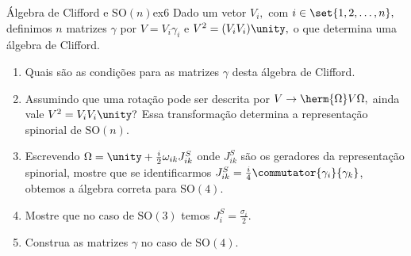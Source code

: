 \begin{exercício}{Álgebra de Clifford e \(\mathrm{SO}(n)\)}{ex6}
    Dado um vetor \(V_i,\) com \(i \in \set{1,2,\dots, n},\) definimos \(n\) matrizes \(\gamma\) por \(V = V_i \gamma_i\) e \(V^2 = (V_i V_i) \unity,\) o que determina uma álgebra de Clifford.
    \begin{enumerate}[label=(\alph*)]
        \item Quais são as condições para as matrizes \(\gamma\) desta álgebra de Clifford.
        \item Assumindo que uma rotação pode ser descrita por \(V \to \herm{\Omega}V \Omega,\) ainda vale \(V^2 = V_i V_i \unity?\) Essa transformação determina a representação spinorial de \(\mathrm{SO}(n)\).
        \item Escrevendo \(\Omega = \unity + \frac{i}{2}\omega_{ik}J^{S}_{ik}\) onde \(J^{S}_{ik}\) são os geradores da representação spinorial, mostre que se identificarmos \(J^{S}_{ik} = \frac{i}{4}\commutator{\gamma_i}{\gamma_k}\), obtemos a álgebra correta para \(\mathrm{SO}(4).\)
        \item Mostre que no caso de \(\mathrm{SO}(3)\) temos \(J^{S}_i = \frac{\sigma_i}{2}\).
        \item Construa as matrizes \(\gamma\) no caso de \(\mathrm{SO}(4)\).
    \end{enumerate}
\end{exercício}
